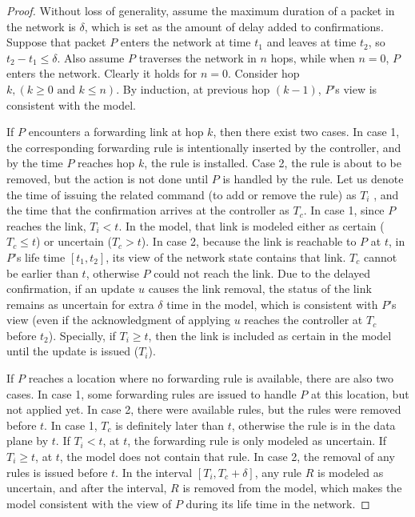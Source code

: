 \begin{proof}
Without loss of generality, assume the maximum duration of a packet in the network is $\delta$, which is set as the amount of delay added to confirmations.
Suppose that packet $P$ enters the network at time $t_1$ and leaves at time $t_2$, so $t_2-t_1 \le \delta$.
Also assume $P$ traverses the network in $n$ hops, while when $n=0$, $P$ enters the network.
Clearly it holds for $n=0$. 
Consider hop $k, (k \ge 0\mbox{ and } k \le n)$.
By induction, at previous hop $(k-1)$, $P$'s view is consistent with the model.

If $P$ encounters a forwarding link at hop $k$, then there exist two cases.
In case 1, the corresponding forwarding rule is intentionally inserted by the controller, 
and by the time $P$ reaches hop $k$, the rule is installed.
Case 2, the rule is about to be removed, but the action is not done until $P$ is handled by the rule.
Let us denote the time of issuing the related command (to add or remove the rule) as $T_i$
, and the time that the confirmation arrives at the controller as $T_c$.
In case 1, since $P$ reaches the link, $T_i < t$.
In the model, that link is modeled either as certain ($T_c \le t$) or uncertain ($T_c > t$).
In case 2, because the link is reachable to $P$ at $t$, 
in $P$'s life time $[t_1, t_2]$, its view of the network state contains that link. 
$T_c$ cannot be earlier than $t$, otherwise $P$ could not reach the link.
Due to the delayed confirmation, if an update $u$ causes the link removal, the status of the link remains as uncertain for extra $\delta$ time in the model, which is consistent with $P$'s view (even if the acknowledgment of applying $u$ reaches the controller at $T_c$ before $t_2$). Specially, if $T_i \ge t$, then the link is included as certain in the model until the update is issued ($T_i$).

If $P$ reaches a location where no forwarding rule is available, there are also two cases. 
In case 1, some forwarding rules are issued to handle $P$ at this location, but not applied yet.
In case 2, there were available rules, but the rules were removed before $t$.
In case 1, $T_c$ is definitely later than $t$, otherwise the rule is in the data plane by $t$. 
If $T_i < t$, at $t$, the forwarding rule is only modeled as uncertain.
If $T_i \ge t$, at $t$, the model does not contain that rule.
In case 2, the removal of any rules is issued before $t$.
In the interval $[T_i, T_c + \delta]$, any rule $R$ is modeled as uncertain, 
and after the interval, $R$ is removed from the model, which makes the model consistent with the view of $P$ during its life time in the network.
\end{proof}
\fi

